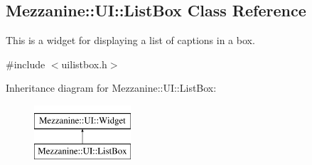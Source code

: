 \hypertarget{classMezzanine_1_1UI_1_1ListBox}{
\subsection{Mezzanine::UI::ListBox Class Reference}
\label{classMezzanine_1_1UI_1_1ListBox}
}


This is a widget for displaying a list of captions in a box.  




{\ttfamily \#include $<$uilistbox.h$>$}

Inheritance diagram for Mezzanine::UI::ListBox:\begin{figure}[H]
\begin{center}
\leavevmode
\includegraphics[height=2.000000cm]{classMezzanine_1_1UI_1_1ListBox}
\end{center}
\end{figure}
